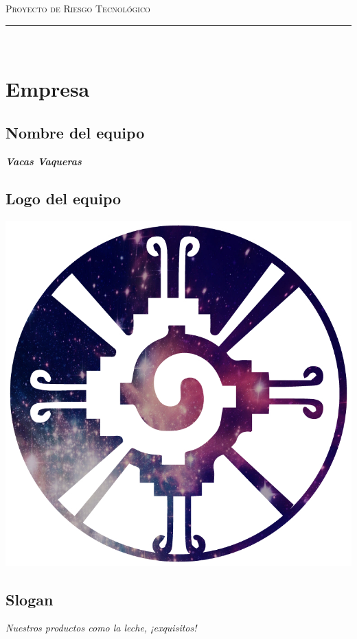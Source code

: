 \documentclass{article}
\begin{document}
\marginsize{2cm}{2cm}{1cm}{2cm} 

\begin{center}
  {\LARGE \scshape Proyecto de Riesgo Tecnológico\\\vspace{10mm} }
  \rule{0.8\textwidth}{.8pt}\\
\end{center}

\section*{Empresa}

\subsection*{Nombre del equipo} \textit{\textbf{Vacas Vaqueras}}
\subsection*{Logo del equipo}
\begin{center}
  \includegraphics[scale=.2]{../imagenes/logo.jpg}
\end{center}
\subsection*{Slogan}
\textit{Nuestros productos como la leche, ¡exquisitos!}
\end{document}
